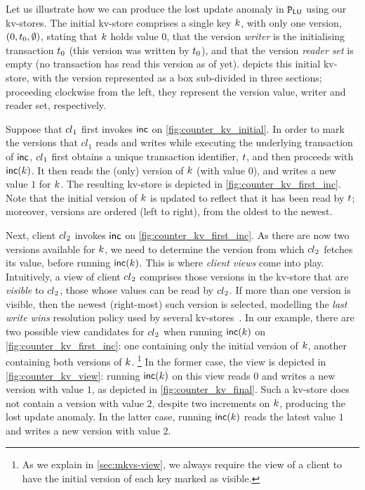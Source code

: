 Let us illustrate how we can produce the lost update anomaly in $\mathtt{P}_{\mathsf{LU}}$ using our kv-stores. 
The initial kv-store comprises a single key $k$, with only one 
version, $(0, t_{0}, \emptyset)$, stating that $k$ holds value $0$, 
that the version \emph{writer} is the initialising transaction $t_0$ (this version was written by $t_0$), 
and that the version \emph{reader set} is empty (no transaction has read this version as of yet). 
 depicts this initial kv-store, with the version
represented as a box sub-divided in three sections;
proceeding clockwise from the left, they represent the version value, writer and reader set, respectively.

Suppose that ${cl}_1$ first invokes $\mathsf{inc}$ on \cref{fig:counter_kv_initial}. 
In order to mark the versions that $cl_1$ reads and writes while executing the underlying transaction of $\mathsf{inc}$,  
${cl}_1$ first obtains a unique transaction identifier, $t$, 
and then proceeds with $\mathsf{inc}(k)$. 
It then reads the (only) version of $k$ (with value $0$), 
and writes a new value $1$ for $k$. 
The resulting kv-store is depicted in \cref{fig:counter_kv_first_inc}.
Note that the initial version of $k$ is updated to reflect that it has been read by $t$; 
moreover, versions are ordered (left to right), from the oldest to the newest.

Next, client ${cl}_2$ invokes $\mathsf{inc}$ on \cref{fig:counter_kv_first_inc}. 
As there are now two versions available for $k$, 
we need to determine the version from which ${cl}_2$ fetches its value, before running $\mathsf{inc}(k)$.
This is where \emph{client views} come into play.
Intuitively, a view of client ${cl}_2$ comprises those versions in the kv-store that are \emph{visible} to ${cl}_2$, 
\ie those whose values can be read by ${cl}_2$. 
If more than one version is visible, then the newest (right-most) such version is selected, 
modelling the \emph{last write wins} resolution policy used by several kv-stores~\cite{vogels:2009:ec:1435417.1435432}. 
In our example, there are two possible view candidates for ${cl}_2$ when running $\mathsf{inc}(k)$ on \cref{fig:counter_kv_first_inc}: 
one containing only the initial version of $k$, 
another containing both versions of $k$.%
\footnote{
As we explain in \cref{sec:mkvs-view}, we always require the view of a client 
to have the initial version of each key marked as visible.}
In the former case, the view is depicted in \cref{fig:counter_kv_view}:
running $\mathsf{inc}(k)$ on this view reads $0$ and writes a new version with value $1$, as depicted in \cref{fig:counter_kv_final}.
Such a kv-store does not contain a version with value $2$, despite two increments on $k$, producing the lost update anomaly.
In the latter case, running $\mathsf{inc}(k)$ reads the latest value $1$ and writes a new version with value $2$.

